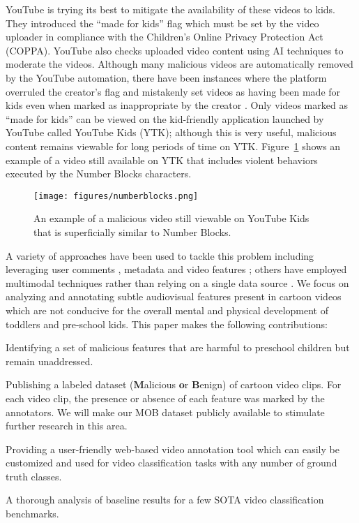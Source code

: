 \documentclass[letterpaper]{article}
\begin{document}
\nocite{federaltradecommission_2020_complying}
YouTube is trying its best to mitigate the availability of these videos to kids.  They introduced the ``made for kids'' flag which must be set by the video uploader in compliance with the Children’s Online Privacy Protection Act (COPPA).  YouTube also checks uploaded video content using AI techniques to moderate the videos.  Although many malicious videos are automatically removed by the YouTube automation, there have been instances where the platform overruled the creator's flag and mistakenly set videos as having been made for kids even when marked as inappropriate by the creator \cite{amadeo_2022_youtube}. Only videos marked as ``made for kids'' can be viewed on the kid-friendly application launched by YouTube called YouTube Kids (YTK); although this is very useful, malicious content remains viewable for long periods of time on YTK. 
 Figure~\ref{fig:example}  shows an example of a video still available on YTK that includes violent behaviors executed by the Number Blocks characters.


\begin{figure}[htp]
    \centering
    \texttt{[image: figures/numberblocks.png]}
    \caption{An example of a malicious video still viewable on YouTube Kids that is superficially similar to Number Blocks.}
    \label{fig:example}
\end{figure}
A variety of approaches have been used to tackle this problem including leveraging user comments \cite{7}, metadata \cite{1,6} and video features \cite{3,9,11}; others have employed multimodal techniques rather than relying on a single data source \cite{2,6,9,10}.  We focus on analyzing and annotating subtle audiovisual features present in cartoon videos which are not conducive for the overall mental and physical development of toddlers and pre-school kids. 
This paper makes the following contributions:
\begin{compactenum}
    \item Identifying a set of malicious features that are harmful to preschool children but remain unaddressed.
    \item Publishing a labeled dataset (\textbf{M}alicious \textbf{o}r \textbf{B}enign) of cartoon video clips. For each video clip, the presence or absence of each feature was marked by the annotators. We will make our MOB dataset publicly available to stimulate further research in this area.
    \item Providing a user-friendly web-based video annotation tool which can easily be customized and used for video classification tasks with any number of ground truth classes. 
    \item A thorough analysis of baseline results for a  few SOTA video classification benchmarks.
\end{compactenum}
\end{document}
